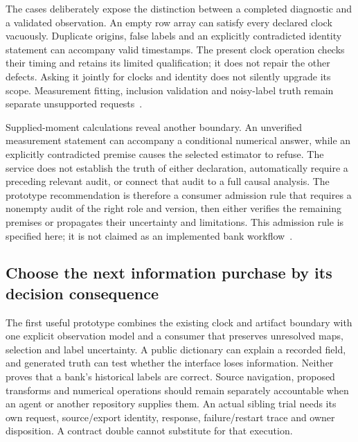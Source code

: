 The cases deliberately expose the distinction between a completed diagnostic
and a validated observation. An empty row array can satisfy every declared
clock vacuously. Duplicate origins, false labels and an explicitly contradicted
identity statement can accompany valid timestamps. The present clock operation
checks their timing and retains its limited qualification; it does not repair
the other defects. Asking it jointly for clocks and identity does not silently
upgrade its scope. Measurement fitting, inclusion validation and noisy-label
truth remain separate unsupported requests~\citep{exec13_observation_primary,exec13_observation_run}.

Supplied-moment calculations reveal another boundary. An unverified measurement
statement can accompany a conditional numerical answer, while an explicitly
contradicted premise causes the selected estimator to refuse. The service
does not establish the truth of either declaration, automatically require
a preceding relevant audit, or connect that audit to a full causal analysis.
The prototype recommendation is therefore a consumer admission rule that
requires a nonempty audit of the right role and version, then either verifies
the remaining premises or propagates their uncertainty and limitations.
This admission rule is specified here; it is not claimed as an implemented
bank workflow~\citep{exec13_observation_design,exec13_observation_run}.



\subsection{Choose the next information purchase by its decision consequence}

The first useful prototype combines the existing clock and artifact boundary
with one explicit observation model and a consumer that preserves unresolved
maps, selection and label uncertainty. A public dictionary can explain a
recorded field, and generated truth can test whether the interface loses
information. Neither proves that a bank's historical labels are correct.
Source navigation, proposed transforms and numerical operations should remain
separately accountable when an agent or another repository supplies them.
An actual sibling trial needs its own request, source/export identity,
response, failure/restart trace and owner disposition. A contract double
cannot substitute for that execution.

